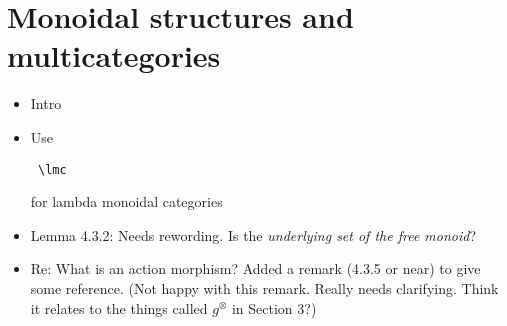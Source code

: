 \documentclass{amsart}
\begin{document}
\section{Monoidal structures and multicategories}

\begin{itemize}
\item Intro
\item Use \begin{verbatim} \lmc \end{verbatim} for lambda monoidal categories
\item Lemma 4.3.2: Needs rewording. Is the \textit{underlying set of the free monoid}?
\item Re: What is an action morphism? Added a remark (4.3.5 or near) to give some reference. (Not happy with this remark. Really needs clarifying. Think it relates to the things called $g^\otimes$ in Section 3?)

\end{itemize}
\end{document}
